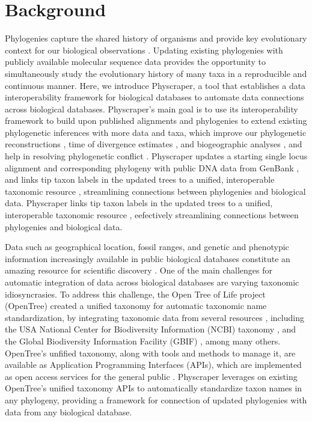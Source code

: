 \documentclass{bmcart}
\begin{document}

\section*{Background}
Phylogenies capture the shared history of organisms and provide key evolutionary
context for our biological observations \cite{dobzhansky1973nothing}.
Updating existing phylogenies with publicly available molecular sequence data provides
the opportunity to simultaneously study
the evolutionary history of many taxa in a reproducible and continuous manner.
Here, we introduce Physcraper, a tool that establishes a data interoperability
framework for biological databases to automate data connections across biological databases.
Physcraper's main goal is to use its interoperability framework to build upon published alignments and phylogenies
to extend existing phylogenetic inferences with more data and taxa, which improve our
phylogenetic reconstructions \cite{hillis1996inferring, natsidis2019phylogenomics},
time of divergence estimates \cite{schulte2013undersampling, soares2015influence},
and biogeographic analyses \cite{kayaalp2017back},
and help in resolving phylogenetic conflict \cite{hedtke2006resolution, townsend2010optimal, natsidis2019phylogenomics}.
Physcraper updates a starting single locus alignment and corresponding phylogeny
with public DNA data from GenBank \cite{benson2000genbank}, and links tip taxon labels in the updated trees to a unified, interoperable
taxonomic resource \cite{rees2017automated}, streamlining connections between phylogenies and biological data.
Physcraper links tip taxon labels in the updated trees to a unified, interoperable
taxonomic resource \cite{rees2017automated}, eefectively streamlining connections between phylogenies and biological data.

Data such as
geographical location, fossil ranges, and genetic and phenotypic information increasingly
available in public biological databases constitute an amazing
resource for scientific discovery \cite{baxevanis2015importance}.
One of the main challenges for automatic
integration of data across biological databases are varying taxonomic idiosyncrasies.
To address this challenge, the Open Tree of Life project (OpenTree)
created a unified taxonomy for automatic taxonomic name standardization, by integrating taxonomic
data from several resources \cite{rees2017automated}, including the USA National
Center for Biodiversity Information (NCBI) taxonomy \cite{federhen_ncbi_2012, schoch_ncbi_2020},
and the Global Biodiversity Information Facility (GBIF) \cite{gbif_secretariat_gbif_2019}, among many others.
OpenTree's unfified taxonomy, along with tools and methods to manage it, are available
as Application Programming Interfaces (APIs),
which are implemented as open access services for the general public \cite{opentreeAPIs}.
Physcraper leverages on existing OpenTree's unified taxonomy APIs to automatically
standardize taxon names in any phylogeny, providing
a framework for connection of updated phylogenies with data from any biological database.
\end{document}
